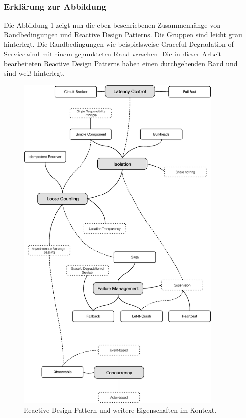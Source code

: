 \noindent\makebox[\linewidth]{\rule{\textwidth}{0.4pt}}

\subsubsection{Erklärung zur Abbildung}
Die Abbildung \ref{fig:patterns-context} zeigt nun die eben beschriebenen Zusammenhänge von Randbedingungen und Reactive Design Patterns. Die Gruppen sind leicht grau hinterlegt. Die Randbedingungen wie beispielsweise Graceful Degradation of Service sind mit einem gepunkteten Rand versehen. Die in dieser Arbeit bearbeiteten Reactive Design Patterns haben einen durchgehenden Rand und sind weiß hinterlegt.

\begin{figure}[H]
 \centering
 \includegraphics[width=0.9\textwidth]{4-Hauptteil/context/context.eps}
 \caption{Reactive Design Pattern und weitere Eigenschaften im Kontext.}
 \label{fig:patterns-context}
\end{figure}